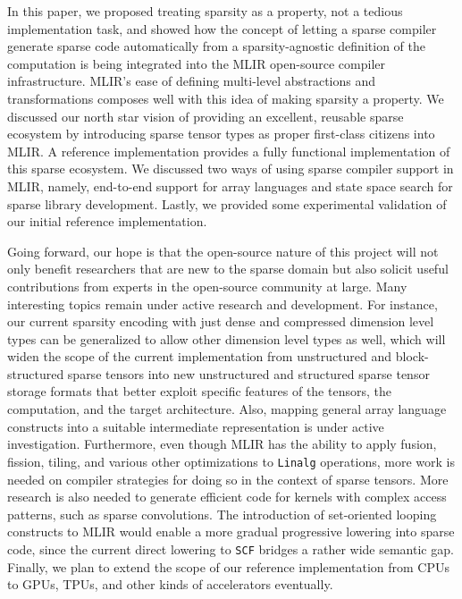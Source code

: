 \documentclass[10pt]{article}
\begin{document}
In this paper, we proposed treating sparsity as a property, not a tedious implementation task, and showed how the concept of letting a sparse compiler generate sparse code automatically from a sparsity-agnostic definition of the computation is being integrated into the MLIR open-source compiler infrastructure. MLIR's ease of defining multi-level abstractions and transformations composes well with this idea of making sparsity a property. We discussed our north star vision of providing an excellent, reusable sparse ecosystem by introducing sparse tensor types as proper first-class citizens into MLIR. A reference implementation provides a fully functional implementation of this sparse ecosystem. We discussed two ways of using sparse compiler support in MLIR, namely, end-to-end support for array languages and state space search for sparse library development. Lastly, we provided some experimental validation of our initial reference implementation.

Going forward, our hope is that the open-source nature of this project will not only benefit researchers that are new to the sparse domain but also solicit useful contributions from experts in the open-source community at large. Many interesting topics remain under active research and development. For instance, our current sparsity encoding with just dense and compressed dimension level types can be generalized to allow other dimension level types as well, which will widen the scope of the current implementation from unstructured and block-structured sparse tensors into new unstructured and structured sparse tensor storage formats that better exploit specific features of the tensors, the computation, and the target architecture. Also, mapping general array language constructs into a suitable intermediate representation is under active investigation. Furthermore, even though MLIR has the ability to apply fusion, fission, tiling, and various other optimizations to \texttt{Linalg} operations, more work is needed on compiler strategies for doing so in the context of sparse tensors. More research is also needed to generate efficient code for kernels with complex access patterns, such as sparse convolutions. The introduction of set-oriented looping constructs to MLIR would enable a more gradual progressive lowering into sparse code, since the current direct lowering to \texttt{SCF} bridges a rather wide semantic gap. Finally, we plan to extend the scope of our reference implementation from CPUs to GPUs, TPUs, and other kinds of accelerators eventually.
\end{document}
